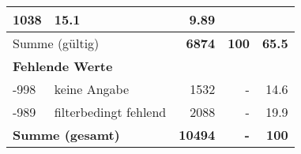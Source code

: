 \begin{longtable}{lXrrr}
       \num{1038} &
       \num[round-mode=places,round-precision=2]{15.1} &
         \num[round-mode=places,round-precision=2]{9.89} \\
     \midrule
     \multicolumn{2}{l}{Summe (gültig)} &
       \textbf{\num{6874}} &
     \textbf{\num{100}} &
       \textbf{\num[round-mode=places,round-precision=2]{65.5}} \\
     \multicolumn{5}{l}{\textbf{Fehlende Werte}}\\
       -998 &
       keine Angabe &
         \num{1532} &
        - &
         \num[round-mode=places,round-precision=2]{14.6} \\
       -989 &
       filterbedingt fehlend &
         \num{2088} &
        - &
         \num[round-mode=places,round-precision=2]{19.9} \\
     \midrule
     \multicolumn{2}{l}{\textbf{Summe (gesamt)}} &
          \textbf{\num{10494}} &
        \textbf{-} &
        \textbf{\num{100}} \\
     \bottomrule
     \end{longtable}
     
